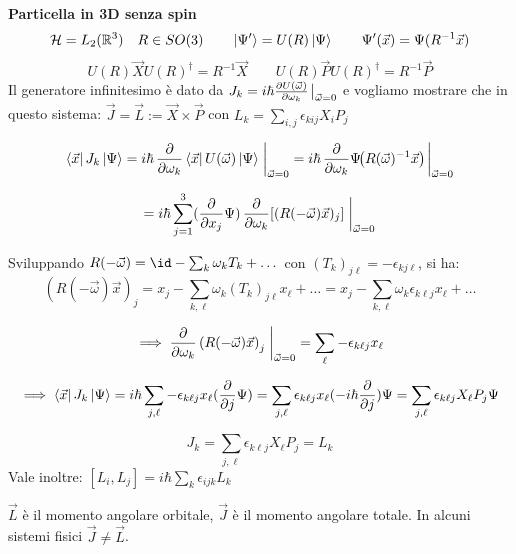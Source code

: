 \begin{example}
    \textbf{Particella in 3D senza spin}
    \[
        \mathcal{H} = L_2(\mathbb{R}^3) \quad R \in SO(3)\qquad
        \ket{\Psi' }= U(R)\ket{\Psi} \qquad \Psi'(\vec{x})= \Psi(R^{-1}\vec{x}) 
    \]
    \[
        U(R)\vec{X}U(R)^\dagger = R^{-1} \vec{X}    \qquad U(R)\vec{P}U(R)^\dagger = R^{-1}\vec{P}  
    \]
    Il generatore infinitesimo è dato da \(J_k = i\hbar  \pdv{U(\vec{\omega})}{\omega_k}\eval_{\vec{\omega}=0}\) 
    e vogliamo mostrare che in questo sistema: \(\vec{J}= \vec{L}:= \vec{X}\times \vec{P}\) con \( L_k = \sum_{i,j}\epsilon_{kij}X_i P_j\)

    \[
    \bra{\vec{x}}J_k\ket{\Psi}
    = i\hbar\,\pdv{}{\omega_k}\bra{\vec{x}}U(\vec{\omega})\ket{\Psi}\eval_{\vec{\omega}=0}
    = i\hbar\,\pdv{}{\omega_k}\Psi\!\big(R(\vec{\omega})^{-1}\vec{x}\big)\eval_{\vec{\omega}=0}
    \]

    \[
    = i\hbar\sum_{j=1}^{3}(\pdv{x_j}\Psi)\,\pdv{}{\omega_k}\!\left[(R(-\vec{\omega})\vec{x})_j\right]\eval_{\vec{\omega}=0}
    \]

    Sviluppando \(R(-\vec{\omega})=\id-\sum_k\omega_k T_k+\dots\) con 
    \((T_k)_{j\ell}=-\epsilon_{k j \ell}\), si ha:
    \[
    (R(-\vec{\omega})\vec{x})_j = x_j - \sum_{k,\ell}\omega_k(T_k)_{j\ell}x_\ell+ \dots
    = x_j - \sum_{k,\ell}\omega_k\epsilon_{k \ell j}x_\ell + \dots
    \]

    \[
    \implies \pdv{}{\omega_k} \left(R(-\vec{\omega})\vec{x}\right)_j\eval_{\vec{\omega}=0}
    = \sum_{\ell}-\epsilon_{k  \ell j}x_\ell
    \]

    \[
    \implies \bra{\vec{x}}J_k\ket{\Psi}
    = i\hbar\sum_{j,\ell}-\epsilon_{k  \ell j}x_\ell(\pdv{j}\Psi)
    = \sum_{j,\ell}\epsilon_{k\ell j}x_\ell(-i\hbar\pdv{j})\Psi
    = \sum_{j,\ell}\epsilon_{k\ell j}X_\ell P_j\Psi
    \]

    \[
    \boxed{J_k = \sum_{j,\ell}\epsilon_{k\ell j}X_\ell P_j = L_k}
    \]
    Vale inoltre: \(\left[ L_i, L_j \right]= i\hbar \sum_k \epsilon_{ijk} L_k\)

    \begin{attention}
        \(\vec{L}\) è il momento angolare orbitale, \(\vec{J}\) è il momento angolare totale. In alcuni sistemi fisici \(\vec{J}\neq \vec{L}\).
    \end{attention}
\end{example}

